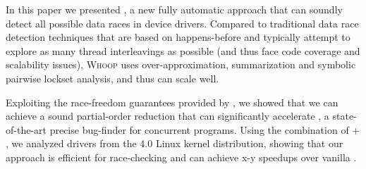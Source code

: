 In this paper we presented \whoop, a new fully automatic approach that can soundly detect all possible data races in device drivers. Compared to traditional data race detection techniques that are based on happens-before and typically attempt to explore as many thread interleavings as possible (and thus face code coverage and scalability issues), \textsc{Whoop} uses over-approximation, summarization and symbolic pairwise lockset analysis, and thus can scale well.

Exploiting the race-freedom guarantees provided by \whoop, we showed that we can achieve a sound partial-order reduction that can significantly accelerate \corral, a state-of-the-art precise bug-finder for concurrent programs. Using the combination of \whoop + \corral, we analyzed \sizeOfBenchmarks drivers from the 4.0 Linux kernel distribution, showing that our approach is efficient for race-checking and can achieve x-y speedups over vanilla \corral.
